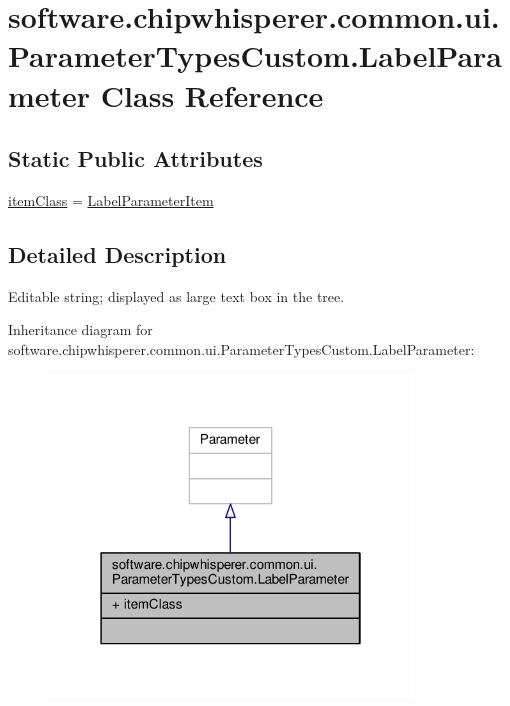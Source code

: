 \hypertarget{classsoftware_1_1chipwhisperer_1_1common_1_1ui_1_1ParameterTypesCustom_1_1LabelParameter}{}\section{software.\+chipwhisperer.\+common.\+ui.\+Parameter\+Types\+Custom.\+Label\+Parameter Class Reference}
\label{classsoftware_1_1chipwhisperer_1_1common_1_1ui_1_1ParameterTypesCustom_1_1LabelParameter}
\subsection*{Static Public Attributes}
\begin{DoxyCompactItemize}
\item 
\hyperlink{classsoftware_1_1chipwhisperer_1_1common_1_1ui_1_1ParameterTypesCustom_1_1LabelParameter_ab94fd0ed23f05be7f03731bbb7d6446b}{item\+Class} = \hyperlink{classsoftware_1_1chipwhisperer_1_1common_1_1ui_1_1ParameterTypesCustom_1_1LabelParameterItem}{Label\+Parameter\+Item}
\end{DoxyCompactItemize}


\subsection{Detailed Description}
\begin{DoxyVerb}Editable string; displayed as large text box in the tree.\end{DoxyVerb}
 

Inheritance diagram for software.\+chipwhisperer.\+common.\+ui.\+Parameter\+Types\+Custom.\+Label\+Parameter\+:\nopagebreak
\begin{figure}[H]
\begin{center}
\leavevmode
\includegraphics[width=274pt]{db/dbc/classsoftware_1_1chipwhisperer_1_1common_1_1ui_1_1ParameterTypesCustom_1_1LabelParameter__inherit__graph}
\end{center}
\end{figure}


